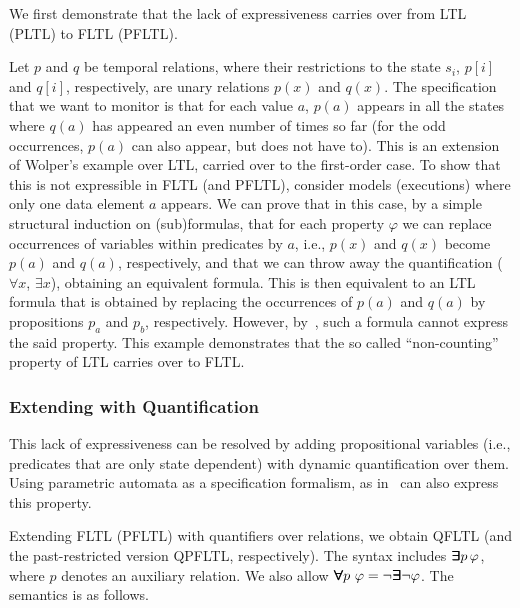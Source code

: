 
We first demonstrate that the lack of expressiveness
carries over from LTL (PLTL) to FLTL (PFLTL).

Let $p$ and $q$ be temporal relations, where their
restrictions to the state $s_i$, $p[i]$ and $q[i]$, respectively, are unary relations $p(x)$ and $q(x)$. The
specification that we want to monitor is that for each value
$a$, $p(a)$ appears in all the states where $q(a)$ has appeared an even number of times so far (for the odd occurrences, $p(a)$ can also appear, but does not have to). This is an extension of
Wolper's example over LTL, carried over to the first-order case. To show that this is not expressible in FLTL (and PFLTL),
consider models (executions) where only one data element $a$ appears. We can prove that in this case, by a simple structural induction on (sub)formulas, that for each property $\varphi$
we can replace occurrences of variables within
predicates by $a$, i.e., $p(x)$ and $q(x)$ become $p(a)$
and $q  (a )$, respectively, and that we can throw away
the quantification ($\forall x$, $\exists x$), obtaining
an equivalent formula. This is then equivalent to
an LTL formula that is obtained by replacing
the occurrences of $p(a)$ and $q(a)$ by propositions
$p_a$ and $p_b$, respectively. However, by~\cite{Wolper},
such a formula cannot express the said property.
This example demonstrates that the so called ``non-counting''~\cite{Thomas} property of LTL carries over
to FLTL. 

\subsubsection{Extending with Quantification}

This lack of expressiveness can be resolved by
adding propositional variables (i.e., predicates that are
only state dependent) with dynamic quantification over them.
Using parametric automata as a specification formalism, as in~\cite{Grum,havelund-rv-data-2018,Meredith2011,Reger2015} can also express this property.

Extending FLTL (PFLTL) with quantifiers over relations, we obtain QFLTL
(and the past-restricted version QPFLTL, respectively). 
The syntax includes $\bm{\exists}\kern-0.6em\bm{\exists} p \, \varphi$, 
where $p$ denotes an auxiliary relation.
We also allow $\bm{\forall}\kern-0.6em\bm{\forall} p\ \varphi = \neg \bm{\exists}\kern-0.6em\bm{\exists} \neg \varphi$. The semantics is as follows.



